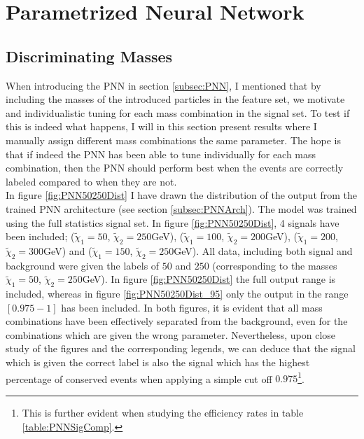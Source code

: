\section{Parametrized Neural Network}
\subsection{Discriminating Masses}
When introducing the \ac{PNN} in section \ref{subsec:PNN}, I mentioned that by including the masses of the introduced particles
in the feature set, we motivate and individualistic tuning for each mass combination in the signal set. To test if this is indeed what 
happens, I will in this section present results where I manually assign different mass combinations the same parameter. The hope 
is that if indeed the \ac{PNN} has been able to tune individually for each mass combination, then the \ac{PNN} should perform best 
when the events are correctly labeled compared to when they are not. 
\\
In figure \ref{fig:PNN50250Dist} I have drawn the distribution of the output from the trained \ac{PNN} architecture 
(see section \ref{subsec:PNNArch}). The model was trained using the full statistics signal set. In figure \ref{fig:PNN50250Dist},
4 signals have been included; ($\tilde{\chi}_1=50$, $\tilde{\chi}_2=250$GeV), ($\tilde{\chi}_1=100$, $\tilde{\chi}_2=200$GeV), 
($\tilde{\chi}_1=200$, $\tilde{\chi}_2=300$GeV) and ($\tilde{\chi}_1=150$, $\tilde{\chi}_2=250$GeV). All data, including 
both signal and background were given the labels of $50$ and $250$ (corresponding to the masses $\tilde{\chi}_1=50$, $\tilde{\chi}_2=250$GeV). 
In figure \ref{fig:PNN50250Dist} the full output range is included, whereas in figure \ref{fig:PNN50250Dist_95} only the output in the 
range $[0.975-1]$ has been included. In both figures, it is evident that all mass combinations have been effectively separated from the background,
even for the combinations which are given the wrong parameter. Nevertheless, upon close study of the figures and the corresponding legends, we can deduce that
the signal which is given the correct label is also the signal which has the highest percentage of conserved events when applying a simple cut off 
$0.975$\footnote{This is further evident when studying the efficiency rates in table \ref{table:PNNSigComp}.}.\\
